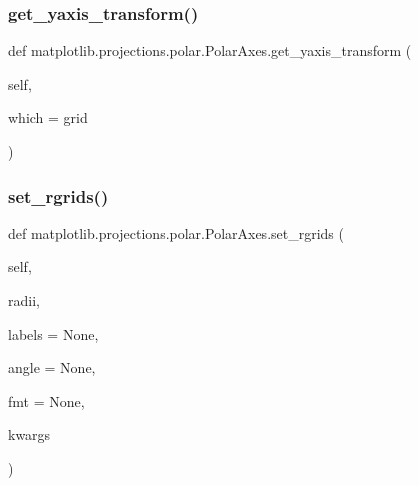 \subsubsection{\texorpdfstring{get\+\_\+yaxis\+\_\+transform()}{get\_yaxis\_transform()}}
{\footnotesize\ttfamily def matplotlib.\+projections.\+polar.\+Polar\+Axes.\+get\+\_\+yaxis\+\_\+transform (\begin{DoxyParamCaption}\item[{}]{self,  }\item[{}]{which = {\ttfamily \textquotesingle{}grid\textquotesingle{}} }\end{DoxyParamCaption})}

\mbox{\label{classmatplotlib_1_1projections_1_1polar_1_1PolarAxes_a0b0f075aa2b3f3bf6754441395ccf5c8}} 
\subsubsection{\texorpdfstring{set\+\_\+rgrids()}{set\_rgrids()}}
{\footnotesize\ttfamily def matplotlib.\+projections.\+polar.\+Polar\+Axes.\+set\+\_\+rgrids (\begin{DoxyParamCaption}\item[{}]{self,  }\item[{}]{radii,  }\item[{}]{labels = {\ttfamily None},  }\item[{}]{angle = {\ttfamily None},  }\item[{}]{fmt = {\ttfamily None},  }\item[{}]{kwargs }\end{DoxyParamCaption})}

